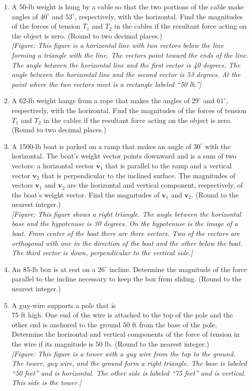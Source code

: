 \documentclass{exercises}
\begin{document}
\begin{enumerate}[resume]
\item \techrequired A 50-lb weight is hung by a cable so that the two portions of the cable make angles of $40^\circ$ and $53^\circ$, respectively, with the horizontal. Find the magnitudes of the forces of tension $T_{1}$ and $T_{2}$ in the cables if the resultant force acting on the object is zero. (Round to two decimal places.) \\ \textit{[Figure: This figure is a horizontal line with two vectors below the line forming a triangle with the line. The vectors point toward the ends of the line. The angle between the horizontal line and the first vector is 40 degrees. The angle between the horizontal line and the second vector is 53 degrees. At the point where the two vectors meet is a rectangle labeled ``50 lb.'']}
\item \techrequired A 62-lb weight hangs from a rope that makes the angles of $29^\circ$ and $61^\circ$, respectively, with the horizontal. Find the magnitudes of the forces of tension $T_{1}$ and $T_{2}$ in the cables if the resultant force acting on the object is zero. (Round to two decimal places.)
\item \techrequired A 1500-lb boat is parked on a ramp that makes an angle of $30^\circ$ with the horizontal. The boat's weight vector points downward and is a sum of two vectors: a horizontal vector $\mathbf{v}_{1}$ that is parallel to the ramp and a vertical vector $\mathbf{v}_{2}$ that is perpendicular to the inclined surface. The magnitudes of vectors $\mathbf{v}_{1}$ and $\mathbf{v}_{2}$ are the horizontal and vertical component, respectively, of the boat's weight vector. Find the magnitudes of $\mathbf{v}_{1}$ and $\mathbf{v}_{2}$. (Round to the nearest integer.) \\ \textit{[Figure: This figure shows a right triangle. The angle between the horizontal base and the hypotenuse is 30 degrees. On the hypotenuse is the image of a boat. From center of the boat there are three vectors. Two of the vectors are orthogonal with one in the direction of the boat and the other below the boat. The third vector is down, perpendicular to the vertical side.]}
\item \techrequired An 85-lb box is at rest on a $26^\circ$ incline. Determine the magnitude of the force parallel to the incline necessary to keep the box from sliding. (Round to the nearest integer.)
\item A guy-wire supports a pole that is \\ $75$ ft high. One end of the wire is attached to the top of the pole and the other end is anchored to the ground $50$ ft from the base of the pole. Determine the horizontal and vertical components of the force of tension in the wire if its magnitude is $50$ lb. (Round to the nearest integer.) \\ \textit{[Figure: This figure is a tower with a guy wire from the top to the ground. The tower, guy wire, and the ground form a right triangle. The base is labeled ``50 feet'' and is horizontal. The other side is labeled ``75 feet'' and is vertical. This side is the tower.]}

\end{enumerate}
\end{document}
